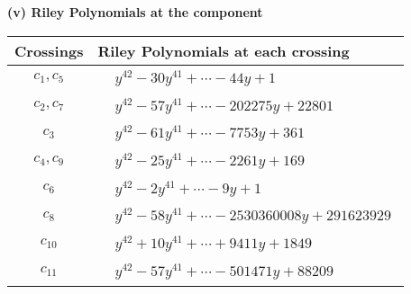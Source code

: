 \documentclass[1p]{elsarticle_modified}
\theoremstyle{definition}
\begin{document}
\newpage\renewcommand{\arraystretch}{1}
\flushleft \textbf{(v) Riley Polynomials at the component}\newline \\
\begin{tabular}{m{50pt}|m{274pt}}
Crossings & \hspace{64pt}Riley Polynomials at each crossing \\
\hline $$\begin{aligned}c_{1},c_{5}\end{aligned}$$&$\begin{aligned}
&y^{42}-30 y^{41}+\cdots-44 y+1
\end{aligned}$\\
\hline $$\begin{aligned}c_{2},c_{7}\end{aligned}$$&$\begin{aligned}
&y^{42}-57 y^{41}+\cdots-202275 y+22801
\end{aligned}$\\
\hline $$\begin{aligned}c_{3}\end{aligned}$$&$\begin{aligned}
&y^{42}-61 y^{41}+\cdots-7753 y+361
\end{aligned}$\\
\hline $$\begin{aligned}c_{4},c_{9}\end{aligned}$$&$\begin{aligned}
&y^{42}-25 y^{41}+\cdots-2261 y+169
\end{aligned}$\\
\hline $$\begin{aligned}c_{6}\end{aligned}$$&$\begin{aligned}
&y^{42}-2 y^{41}+\cdots-9 y+1
\end{aligned}$\\
\hline $$\begin{aligned}c_{8}\end{aligned}$$&$\begin{aligned}
&y^{42}-58 y^{41}+\cdots-2530360008 y+291623929
\end{aligned}$\\
\hline $$\begin{aligned}c_{10}\end{aligned}$$&$\begin{aligned}
&y^{42}+10 y^{41}+\cdots+9411 y+1849
\end{aligned}$\\
\hline $$\begin{aligned}c_{11}\end{aligned}$$&$\begin{aligned}
&y^{42}-57 y^{41}+\cdots-501471 y+88209
\end{aligned}$\\
\hline
\end{tabular}\\~\\
\end{document}
